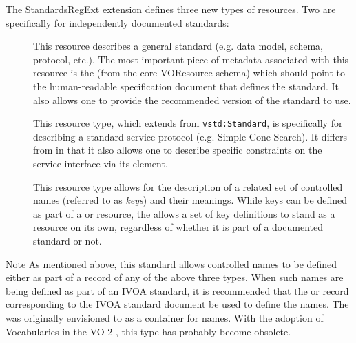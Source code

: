 \documentclass[11pt,a4paper]{ivoa}
\begin{document}
The StandardsRegExt extension defines three new types of resources.  Two
are specifically for independently documented standards:

\begin{description}
\item[] This resource describes a general standard (e.g. data model,
       schema, protocol, etc.).  The most important piece of metadata
       associated with this resource is the
       (from the core VOResource schema) 
       which should point to the human-readable specification document
       that defines the standard.  It also allows one to provide the
       recommended version of the standard to use.  
\item[] This resource type, which extends from
       \texttt{vstd:Standard}, is specifically for describing a
       standard service protocol (e.g. Simple Cone Search).  It
       differs from  in that it also allows
       one to describe specific constraints on the service interface
       via its
       element. 
\item[] This resource type allows for the description of a related set of 
       controlled names (referred to as \emph{keys}) and their
       meanings.  While keys can be defined as part of a
        or 
       resource, the  allows 
       a set of key definitions to stand as a resource on its own,
       regardless of whether it is part of a documented standard or
       not.

\end{description}

\begin{admonition}{Note}
       As mentioned above, this standard allows controlled names to be
       defined either as part of a record of any of the above three
       types.  When such names are being defined as part of an IVOA
       standard, it is recommended that the  or
        record corresponding to the
       IVOA standard document be used to define the names.  The
        was originally envisioned to
       as a container for names.  With the adoption of Vocabularies in
       the VO 2 \citep{2021ivoa.spec.0525D}, this type has probably
       become obsolete.
\end{admonition}
\end{document}

